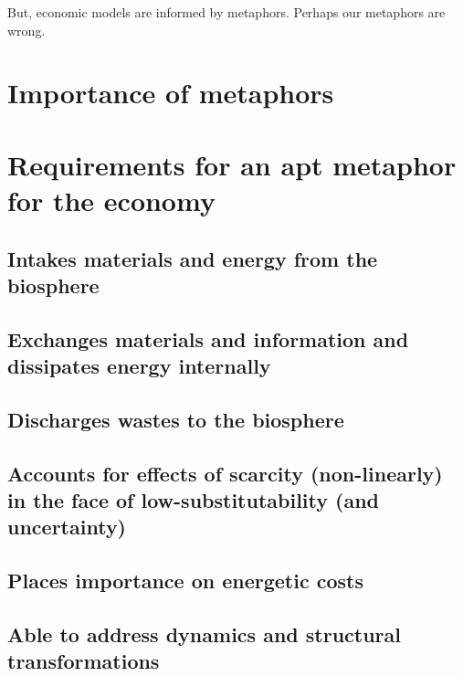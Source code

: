 But, economic models are informed by metaphors. Perhaps our metaphors are wrong.

\section{Importance of metaphors}
\label{sec:importance_metaphors}

\section{Requirements for an apt metaphor for the economy}
\label{sec:metaphor_requirements}

\subsection{Intakes materials and energy from the biosphere}
\label{sec:inputs}

\subsection{Exchanges materials and information and dissipates energy internally}
\label{sec:internal_exchange}

\subsection{Discharges wastes to the biosphere}
\label{sec:discharges_waste}

\subsection{Accounts for effects of scarcity (non-linearly) in the face of low-substitutability (and uncertainty)}
\label{sec:accounts_for_scarcity}

\subsection{Places importance on energetic costs}
\label{sec:importance_of_energy}

\subsection{Able to address dynamics and structural transformations}
\label{sec:structure}

